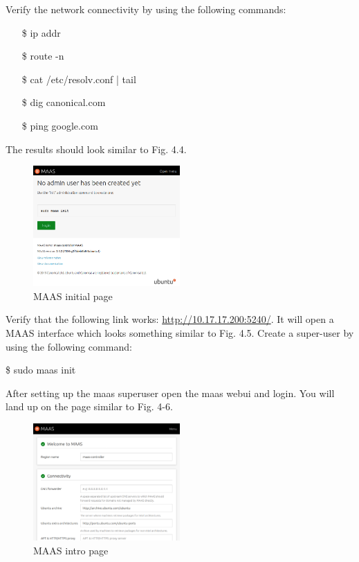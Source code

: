 Verify the network connectivity by using the following commands:

\begin{itemize}
    \setlength\itemsep{-1em}
    \item[\$] ip addr
    \item[\$] route -n
    \item[\$] cat /etc/resolv.conf | tail 
    \item[\$] dig canonical.com
    \item[\$] ping google.com 
\end{itemize}

The results should look similar to Fig. 4.4.

\begin{figure}[!ht]
    \centering
    \includegraphics[width=0.5\textwidth]{images/4-5.png}
    \caption{MAAS initial page}
\end{figure}

Verify that the following link works: \url{http://10.17.17.200:5240/}. It will open a MAAS interface which looks something similar to Fig. 4.5. Create a super-user by using the following command: 

\$ sudo maas init

After setting up the maas superuser open the maas webui and login. You will land up on the page similar to Fig. 4-6.

\begin{figure}[!ht]
    \centering
    \includegraphics[width=0.5\textwidth]{images/4-6.png}
    \caption{MAAS intro page}
\end{figure}

